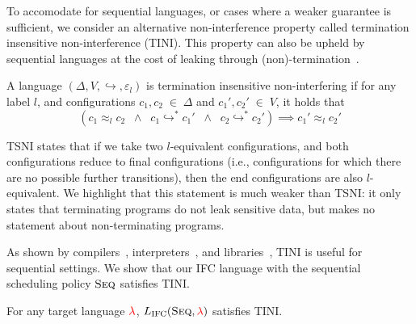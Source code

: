 \documentclass{sigplanconf}
\newcommand{\Red}[1]{{\color{red} #1}}
\begin{document}
%
To accomodate for sequential languages, or cases where a weaker guarantee
is sufficient, we consider an alternative non-interference property called termination insensitive
non-interference (TINI).  This property can also be upheld by sequential languages at the cost
of leaking through (non)-termination~\cite{Askarov:2008}.
%
\begin{definition}
  A language \ensuremath{(\Delta,V,\hookrightarrow,\varepsilon_{l})} is termination
  insensitive non-interfering if for any label \ensuremath{l}, and configurations
  \ensuremath{c_{1},c_{2}\;\in\;\Delta} and \ensuremath{c_{1}',c_{2}'\;\in\;V}, it holds that
  \[
    (\ensuremath{c_{1}} \approx_{\ensuremath{l}} \ensuremath{c_{2}}
    \;\;\land\;\;
    \ensuremath{c_{1}} \ensuremath{\hookrightarrow}^* \ensuremath{c_{1}'}
    \;\;\land\;\;
    \ensuremath{c_{2}} \ensuremath{\hookrightarrow}^* \ensuremath{c_{2}'})
    \implies
    \ensuremath{c_{1}'} \approx_{\ensuremath{l}} \ensuremath{c_{2}'}
  \]
\end{definition}

TSNI states that if we take two \ensuremath{l}-equivalent configurations, and both
configurations reduce to final configurations (i.e.,
configurations for which there are no
possible further transitions), then the end configurations are also
\ensuremath{l}-equivalent.
%
We highlight that this statement is much weaker than TSNI: it only states that
terminating programs do not leak sensitive data, but makes no statement
about non-terminating programs.

As shown by compilers~\cite{jif,FlowCaml}, interpreters~\cite{JSFlow}, and
libraries~\cite{Russo+:Haskell08,lio}, TINI is useful for sequential
settings. We show that our IFC language with the sequential scheduling policy
\ensuremath{\textsc{Seq}} satisfies TINI.
%
\begin{theorem}
  \label{thm:seq-tini}
For any target language \ensuremath{\Red{\lambda}}, \ensuremath{L_\text{IFC}(\textsc{Seq},\Red{\lambda})} satisfies TINI.
\end{theorem}
\end{document}
